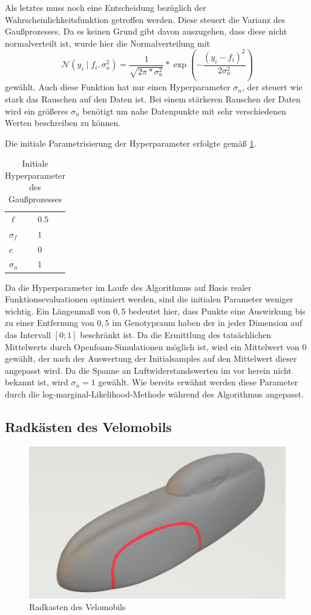 Als letztes muss noch eine Entscheidung bezüglich der Wahrscheinlichkeitsfunktion getroffen werden.
Diese steuert die Varianz des Gaußprozesses.
Da es keinen Grund gibt davon auszugehen, dass diese nicht normalverteilt ist, wurde hier die Normalverteilung mit
\[
	\mathcal{N}(y_i \mid f_i, \sigma_n^2) = \frac{1}{\sqrt{2\pi*\sigma_n^2}}*\exp\left(-\frac{(y_i - f_i)^2}{2\sigma_n^2}\right)
\]
gewählt.
Auch diese Funktion hat nur einen Hyperparameter $\sigma_n$, der steuert wie stark das Rauschen auf den Daten ist.
Bei einem stärkeren Rauschen der Daten wird ein größeres $\sigma_n$ benötigt um nahe Datenpunkte mit sehr verschiedenen Werten beschreiben zu können.

Die initiale Parametrisierung der Hyperparameter erfolgte gemäß \cref{tab:initialParams}.

\begin{table}[h]
	\centering
	\begin{tabularx}{.25\textwidth}{ll}\hline
		$\ell$ & $0.5$ \\
		$\sigma_f$ & $1$ \\
		$c$ & $0$ \\
		$\sigma_n$ & $1$ \\
	\end{tabularx}
	\caption{Initiale Hyperparameter des Gaußprozesses}
	\label{tab:initialParams}
\end{table}

Da die Hyperparameter im Laufe des Algorithmus auf Basis realer Funktionsevaluationen optimiert werden, sind die initialen Parameter weniger wichtig.
Ein Längenmaß von $0,5$ bedeutet hier, dass Punkte eine Auswirkung bis zu einer Entfernung von $0,5$ im Genotypraum haben der in jeder Dimension auf das Intervall $[0;1]$ beschränkt ist.
Da die Ermittlung des tatsächlichen Mittelwerts durch Openfoam-Simulationen möglich ist, wird ein Mittelwert von $0$ gewählt, der nach der Auswertung der Initialsamples auf den Mittelwert dieser angepasst wird.
Da die Spanne an Luftwiderstandswerten im vor herein nicht bekannt ist, wird $\sigma_n = 1$ gewählt.
Wie bereits erwähnt werden diese Parameter durch die log-marginal-Likelihood-Methode während des Algorithmus angepasst.


\subsection{Radkästen des Velomobils}
\label{sub:method_wheelcase}
\begin{figure}[h]
	\centering
	\includegraphics[width=.8\linewidth]{bilder/velo_wheelcase}
	\caption{Radkasten des Velomobils}
	\label{fig:wheelcase}
\end{figure}

